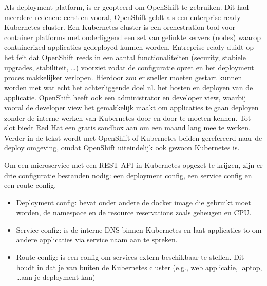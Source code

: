 Als deployment platform, is er geopteerd om OpenShift te gebruiken. Dit had meerdere redenen: eerst en vooral, OpenShift geldt als een enterprise
ready Kubernetes cluster. Een Kubernetes cluster is een orchestration tool voor container platforms met onderliggend een set van gelinkte servers (nodes) waarop
containerized applicaties gedeployed kunnen worden.
Entreprise ready duidt op het feit dat OpenShift reeds in een aantal functionaliteiten (security, stabiele upgrades, stabiliteit, \ldots)
voorziet zodat de configuratie opzet en het deployment proces makkelijker verlopen.
Hierdoor zou er sneller moeten gestart kunnen worden met wat echt het achterliggende doel nl. het hosten en deployen van de applicatie.
OpenShift heeft ook een administrator en developer view, waarbij vooral de developer view het gemakkelijk maakt om applicaties te gaan deployen
zonder de interne werken van Kubernetes door-en-door te moeten kennen.
Tot slot biedt Red Hat een gratis sandbox aan om een maand lang mee te werken. Verder in de tekst wordt met OpenShift of Kubernetes beiden gerefereerd naar de deploy omgeving,
omdat OpenShift uiteindelijk ook gewoon Kubernetes is.\newline
~\autocite{redhatwhatiskubernetes}


Om een microservice met een REST API in Kubernetes opgezet te krijgen, zijn er drie configuratie bestanden nodig: een deployment config,
een service config en een route config.
\begin{itemize}
    \item Deployment config: bevat onder andere de docker image die gebruikt moet worden, de namespace en de resource reservations zoals geheugen en CPU.
    \item Service config: is de interne DNS binnen Kubernetes en laat applicaties to om andere applicaties via service naam aan te spreken.
    \item Route config: is een config om services extern beschikbaar te stellen. Dit houdt in dat je van buiten de Kubernetes cluster (e.g., web applicatie,
    laptop, \ldots aan je deployment kan)
\end{itemize}

